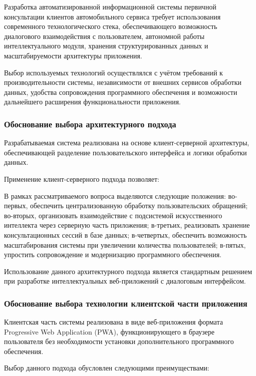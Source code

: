 \documentclass[14pt,a4paper]{extarticle}
\numberwithin{figure}{section}
\numberwithin{table}{section}
\begin{document}
Разработка автоматизированной информационной системы первичной
консультации клиентов автомобильного сервиса требует использования
современного технологического стека, обеспечивающего возможность
диалогового взаимодействия с пользователем, автономной работы
интеллектуального модуля, хранения структурированных данных и
масштабируемости архитектуры приложения.

Выбор используемых технологий осуществлялся с учётом требований к
производительности системы, независимости от внешних сервисов обработки
данных, удобства сопровождения программного обеспечения и возможности
дальнейшего расширения функциональности приложения.

\subsubsection{Обоснование выбора архитектурного подхода}

Разрабатываемая система реализована на основе клиент-серверной
архитектуры, обеспечивающей разделение пользовательского интерфейса и
логики обработки данных.

Применение клиент-серверного подхода позволяет:


В рамках рассматриваемого вопроса выделяются следующие положения: во-первых, обеспечить централизованную обработку пользовательских обращений; во-вторых, организовать взаимодействие с подсистемой искусственного интеллекта через серверную часть приложения; в-третьих, реализовать хранение консультационных сессий в базе данных; в-четвертых, обеспечить возможность масштабирования системы при увеличении количества пользователей; в-пятых, упростить сопровождение и модернизацию программного обеспечения.


Использование данного архитектурного подхода является стандартным
решением при разработке интеллектуальных веб-приложений с диалоговым
интерфейсом.

\subsubsection{Обоснование выбора технологии клиентской части приложения}

Клиентская часть системы реализована в виде веб-приложения формата
Progressive Web Application (PWA), функционирующего в браузере
пользователя без необходимости установки дополнительного программного
обеспечения.

Выбор данного подхода обусловлен следующими преимуществами:
\end{document}
